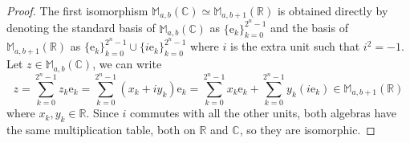 \documentclass{article}
\begin{document}
\begin{proof}
    The first isomorphism $\mathbb{M}_{a,b}(\mathbb{C}) \simeq \mathbb{M}_{a,b+1}(\mathbb{R})$ is obtained directly by denoting the standard basis of $\mathbb{M}_{a,b}(\mathbb{C})$ as $\{ \mathrm e_k \}_{k=0}^{2^n-1}$ and the basis of $\mathbb{M}_{a,b+1}(\mathbb{R})$ as $\{ \mathrm e_k \}_{k=0}^{2^n-1} \cup \{ i\mathrm e_k \}_{k=0}^{2^n-1}$ where $i$ is the extra unit such that $i^2 = -1$. Let $z \in \mathbb{M}_{a,b}(\mathbb{C})$, we can write
    $$ z = \sum_{k=0}^{2^n-1} z_k \mathrm e_k = \sum_{k=0}^{2^n-1} (x_k + i y_k) \mathrm e_k = \sum_{k=0}^{2^n-1} x_k \mathrm e_k +  \sum_{k=0}^{2^n-1} y_k (i\mathrm e_k) \in \mathbb{M}_{a,b+1}(\mathbb{R}) $$
    where $x_k, y_k \in \mathbb{R}$. Since $i$ commutes with all the other units, both algebras have the same multiplication table, both on $\mathbb{R}$ and $\mathbb{C}$, so they are isomorphic.


\end{proof}
\end{document}
